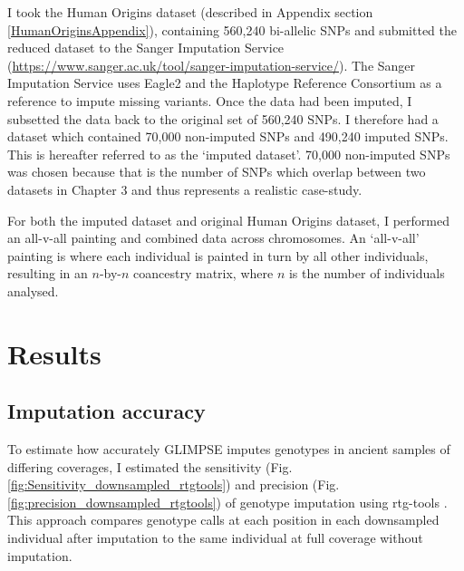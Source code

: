 {I took the Human Origins dataset (described in Appendix section \ref{HumanOriginsAppendix}), containing 560,240 bi-allelic SNPs and submitted the reduced dataset to the Sanger Imputation Service (\url{https://www.sanger.ac.uk/tool/sanger-imputation-service/}). The Sanger Imputation Service uses Eagle2 \cite{loh2016reference} and the Haplotype Reference Consortium as a reference to impute missing variants. Once the data had been imputed, I subsetted the data back to the original set of 560,240 SNPs. I therefore had a dataset which contained 70,000 non-imputed SNPs and 490,240 imputed SNPs. This is hereafter referred to as the `imputed dataset'. 70,000 non-imputed SNPs was chosen because that is the number of SNPs which overlap between two datasets in Chapter 3 and thus represents a realistic case-study. 

For both the imputed dataset and original Human Origins dataset, I performed an all-v-all painting and combined data across chromosomes. An `all-v-all' painting is where each individual is painted in turn by all other individuals, resulting in an $n$-by-$n$ coancestry matrix, where $n$ is the number of individuals analysed.


\section{Results}

\subsection{Imputation accuracy}

To estimate how accurately GLIMPSE imputes genotypes in ancient samples of differing coverages, I estimated the sensitivity (Fig. \ref{fig:Sensitivity_downsampled_rtgtools}) and precision (Fig.  \ref{fig:precision_downsampled_rtgtools}) of genotype imputation using rtg-tools \cite{cleary2014joint}. This approach compares genotype calls at each position in each downsampled individual after imputation to the same individual at full coverage without imputation.

}
